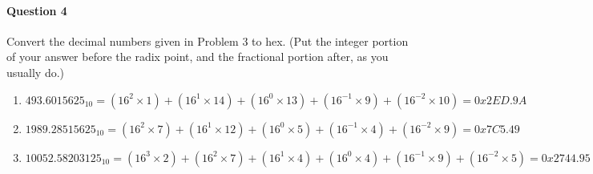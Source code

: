 \documentclass[12pt,letterpaper,notitlepage]{report}
\begin{document}
\paragraph{Question 4} 
Convert the decimal numbers given in Problem 3 to hex. (Put the integer portion of your answer before the radix point, and the fractional portion after, as you usually do.)
\begin{enumerate}[label=\alph*)]
\item $493.6015625_{10} = (16^2\times1)+(16^1\times14)+(16^0\times13)+(16^{-1}\times9)+(16^{-2}\times10) = 0x2ED.9A$
\item $1989.28515625_{10} = (16^2\times7)+(16^1\times12)+(16^0\times5)+(16^{-1}\times4)+(16^{-2}\times9) = 0x7C5.49$
\item $10052.58203125_{10} = (16^3\times2)+(16^2\times7)+(16^1\times4)+(16^0\times4)+(16^{-1}\times9)+(16^{-2}\times5) = 0x2744.95$
\end{enumerate}
\end{document}
